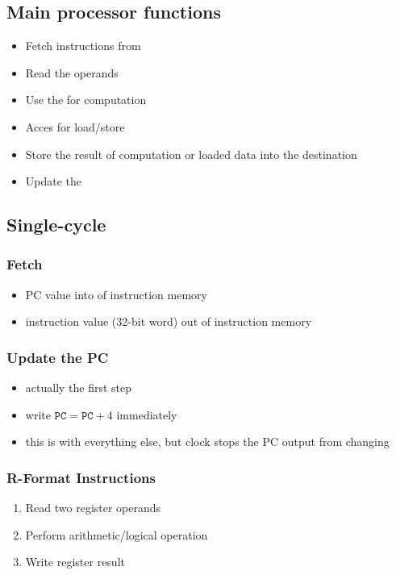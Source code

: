 \documentclass{article}
\begin{document}
\subsection{Main processor functions}
\begin{itemize}
	\item Fetch instructions from 
	\item Read the  operands
	\item Use the  for computation
	\item Acces  for load/store
	\item Store the result of computation or loaded data into the destination 
	\item Update the 
\end{itemize}
\subsection{Single-cycle}
\subsubsection{Fetch}
\begin{itemize}
	\item PC value into  of instruction memory
	\item instruction value (32-bit word) out of instruction memory
\end{itemize}
\subsubsection{Update the PC}
\begin{itemize}
	\item actually the first step
	\item write $\texttt{PC}=\texttt{PC}+4$ immediately
	\item this is  with everything else, but clock stops the PC output from changing 
\end{itemize}
\subsubsection{R-Format Instructions}
\begin{enumerate}
	\item Read two register operands
	\item Perform arithmetic/logical operation
	\item Write register result
\end{enumerate}
\end{document}
